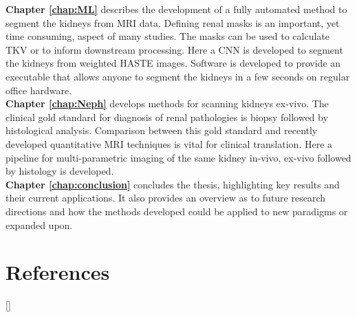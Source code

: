 \textbf{Chapter \ref{chap:ML}} describes the development of a fully automated method to segment the kidneys from \ac{MRI} data. Defining renal masks is an important, yet time consuming, aspect of many studies. The masks can be used to calculate \ac{TKV} or to inform downstream processing. Here a \ac{CNN} is developed to segment the kidneys from \ttwo weighted \ac{HASTE} images. Software is developed to provide an executable that allows anyone to segment the kidneys in a few seconds on regular office hardware.\\

\textbf{Chapter \ref{chap:Neph}} develops methods for scanning kidneys ex-vivo. The clinical gold standard for diagnosis of renal pathologies is biopsy followed by histological analysis. Comparison between this gold standard and recently developed quantitative \ac{MRI} techniques is vital for clinical translation. Here a pipeline for multi-parametric imaging of the same kidney in-vivo, ex-vivo followed by histology is developed.\\

\textbf{Chapter \ref{chap:conclusion}} concludes the thesis, highlighting key results and their current applications. It also provides an overview as to future research directions and how the methods developed could be applied to new paradigms or expanded upon.\\

\newpage
\section{References}
[\refname]{}
\printbibliography
